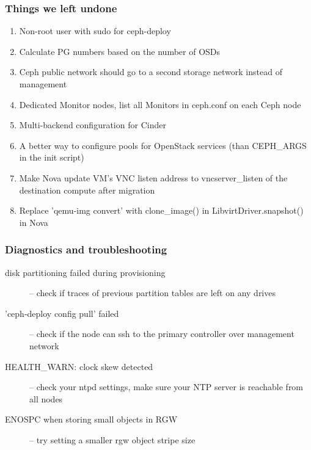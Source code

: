 \documentclass[hyperref=unicode,utf8,xcolor=pst]{beamer}
\begin{document}
\begin{frame}
	\frametitle{Things we left undone}
	\begin{enumerate}
		\item Non-root user with sudo for ceph-deploy
		\item Calculate PG numbers based on the number of OSDs
		\item Ceph public network should go to a second storage
			network instead of management
		\item Dedicated Monitor nodes, list all Monitors in
			ceph.conf on each Ceph node
		\item Multi-backend configuration for Cinder
		\item A better way to configure pools for OpenStack
			services (than CEPH\_ARGS in the init script)
		\item Make Nova update VM's VNC listen address to
			vncserver\_listen of the destination compute
			after migration
		\item Replace 'qemu-img convert' with clone\_image() in
			LibvirtDriver.snapshot() in Nova
	\end{enumerate}
\end{frame}

\begin{frame}
	\frametitle{Diagnostics and troubleshooting}
	\begin{description}
		\item[disk partitioning failed during provisioning] --
			check if traces of previous partition tables are
			left on any drives
			\vspace{1ex}

		\item['ceph-deploy config pull' failed] -- check if the
			node can ssh to the primary controller over
			management network
			\vspace{1ex}

		\item[HEALTH\_WARN: clock skew detected] -- check your
			ntpd settings, make sure your NTP server is
			reachable from all nodes
			\vspace{1ex}

		\item[ENOSPC when storing small objects in RGW] -- try
			setting a smaller rgw object stripe size
	\end{description}
\end{frame}
\end{document}
